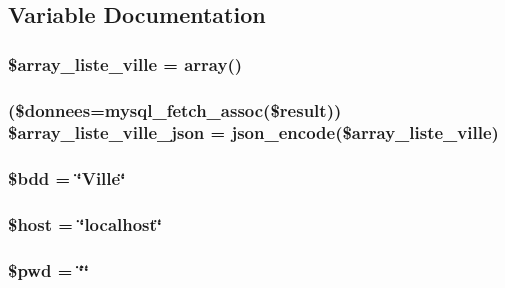 \subsection{Variable Documentation}
\hypertarget{index_8php_a8f00c580755c88b9190084e5128da4e3}{
\subsubsection[{\$array\-\_\-liste\-\_\-ville}]{\setlength{\rightskip}{0pt plus 5cm}\$array\-\_\-liste\-\_\-ville = array()}}\label{index_8php_a8f00c580755c88b9190084e5128da4e3}
\hypertarget{index_8php_afd0f4a07395f4989c1fe3b5e60dec1f7}{
\subsubsection[{\$array\-\_\-liste\-\_\-ville\-\_\-json}]{ (\$donnees=mysql\-\_\-fetch\-\_\-assoc(\$result)) \$array\-\_\-liste\-\_\-ville\-\_\-json = json\-\_\-encode(\$array\-\_\-liste\-\_\-ville)}}\label{index_8php_afd0f4a07395f4989c1fe3b5e60dec1f7}
\hypertarget{index_8php_a94f91e878bce0991e2cd595c5dd79b3f}{
\subsubsection[{\$bdd}]{\setlength{\rightskip}{0pt plus 5cm}\$bdd = \char`\"{}Ville\char`\"{}}}\label{index_8php_a94f91e878bce0991e2cd595c5dd79b3f}
\hypertarget{index_8php_a711797613cb863ca0756df789c396bf2}{
\subsubsection[{\$host}]{\setlength{\rightskip}{0pt plus 5cm}\$host = \char`\"{}localhost\char`\"{}}}\label{index_8php_a711797613cb863ca0756df789c396bf2}
\hypertarget{index_8php_a12e4252e778952d356721bc655cff8c8}{
\subsubsection[{\$pwd}]{\setlength{\rightskip}{0pt plus 5cm}\$pwd = \char`\"{}\char`\"{}}}\label{index_8php_a12e4252e778952d356721bc655cff8c8}
